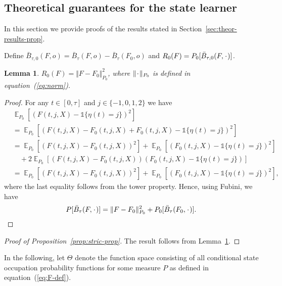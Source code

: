 \documentclass[unnumsec,webpdf,contemporary,large,namedate]{oup-authoring-template}%
\theoremstyle{thmstyleone}%
\newtheorem{lemma}{Lemma}
\theoremstyle{thmstyletwo}%
\theoremstyle{thmstylethree}%
\DeclareMathOperator{\E}{\mathbb{E}} %
\newcommand{\blank}{\makebox[1ex]{\textbf{$\cdot$}}}
\newcommand{\1}{\mathds{1}}
\begin{document}
\begin{appendices}

\section{Theoretical guarantees for the state learner}
\label{sec:proof-proposition}

In this section we provide proofs of the results stated in
Section~\ref{sec:theor-results-prop}.

Define
\( \bar{B}_{\tau,0}(F, o) = \bar{B}_{\tau}(F, o) - \bar{B}_{\tau}(F_0, o) \) and
\( R_{0}(F) = P_0{[\bar{B}_{\tau,0}(F, \blank)]} \).
\begin{lemma}
  \label{lemma:norm}
  \( R_{0}(F) = \Vert F - F_0 \Vert_{P_0}^2 \), where \( \Vert \blank \Vert_{P_0}\) is defined
  in equation~(\ref{eq:norm}).
\end{lemma}
\begin{proof}
  For any \( t \in [0, \tau] \) and \( j\in \{-1,0,1,2\} \) we have
  \begin{align*}
    & \E_{P_0}{\left[ (F(t, j, X) - \1{\{\eta(t) = j \}})^2 \right]}
    \\
    & =    \E_{P_0}{\left[ (F(t, j, X) - F_0(t, j, X) + F_0(t, j, X) - \1{\{\eta(t) = j
      \}})^2 \right]}
    \\
    & =    \E_{P_0}{\left[ (F(t, j, X) - F_0(t, j, X))^2\right]}
      + \E_{P_0}{\left[ (F_0(t, j, X) - \1{\{\eta(t) = j \}})^2\right]}
    \\
    & \quad
      + 2\E_{P_0}{\left[ (F(t, j, X) - F_0(t, j, X))(F_0(t, j, X) - \1{\{\eta(t) = j
      \}})\right]}
    \\
    & =    \E_{P_0}{\left[ (F(t, j, X) - F_0(t, j, X))^2\right]}
      + \E_{P_0}{\left[ (F_0(t, j, X) - \1{\{\eta(t) = j \}})^2\right]},
  \end{align*}
  where the last equality follows from the tower property. Hence, using Fubini,
  we have
  \begin{equation*}
    P{[\bar{B}_{\tau}(F, \blank)]}
    = \Vert F - F_0 \Vert_{P_0}^2 + P_0{[\bar{B}_{\tau}(F_0, \blank)]}.
  \end{equation*}
\end{proof}

\begin{proof}[Proof of Proposition~\ref{prop:stric-prop}]
  The result follows from Lemma~\ref{lemma:norm}.
\end{proof}

In the following, let $\Theta$ denote the function space consisting of all
conditional state occupation probability functions for some measure \( P \) as
defined in equation~(\ref{eq:F-def}).


\end{appendices}
\end{document}
